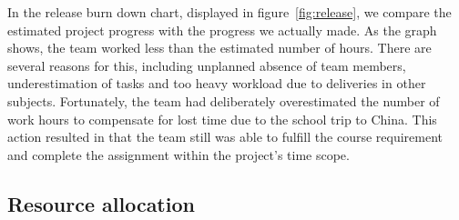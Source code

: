 \noindent In the release burn down chart, displayed in figure~\ref{fig:release}, we compare the estimated project progress with the progress we actually made. As the graph shows, the team worked less than the estimated number of hours. There are several reasons for this, including unplanned absence of team members, underestimation of tasks and too heavy workload due to deliveries in other subjects. Fortunately, the team had deliberately overestimated the number of work hours to compensate for lost time due to the school trip to China. This action resulted in that the team still was able to fulfill the course requirement and complete the assignment within the project's time scope.


\subsection{Resource allocation}
